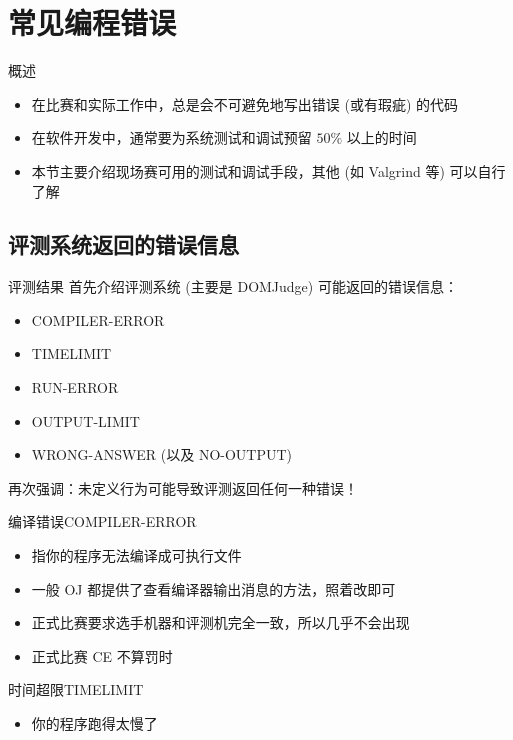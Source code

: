 \documentclass[10pt,mathserif]{beamer}
\begin{document}
\section{常见编程错误}
\sectionpage

\begin{frame}{概述}
	\begin{itemize}
		\item 在比赛和实际工作中，总是会不可避免地写出错误 (或有瑕疵) 的代码
		\item 在软件开发中，通常要为系统测试和调试预留 $50\%$ 以上的时间
		\item 本节主要介绍现场赛可用的测试和调试手段，其他 (如 Valgrind 等) 可以自行了解
	\end{itemize}
\end{frame}

\subsection{评测系统返回的错误信息}

\begin{frame}{评测结果}
	首先介绍评测系统 (主要是 DOMJudge) 可能返回的错误信息：
	\begin{itemize}
		\item COMPILER-ERROR
		\item TIMELIMIT
		\item RUN-ERROR
		\item OUTPUT-LIMIT
		\item WRONG-ANSWER (以及 NO-OUTPUT)
	\end{itemize}
	再次强调：未定义行为可能导致评测返回任何一种错误！
\end{frame}

\begin{frame}{编译错误}{COMPILER-ERROR}
	\begin{itemize}
		\item 指你的程序无法编译成可执行文件
		\item 一般 OJ 都提供了查看编译器输出消息的方法，照着改即可
		\item 正式比赛要求选手机器和评测机完全一致，所以几乎不会出现
		\item 正式比赛 CE 不算罚时
	\end{itemize}
\end{frame}

\begin{frame}{时间超限}{TIMELIMIT}
	\begin{itemize}
		\item 你的程序跑得太慢了
	\end{itemize}
\end{frame}
\end{document}

